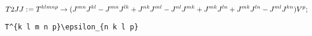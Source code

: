 \documentclass[11pt]{article}
\def\specialcolon{\mathrel{\mathop{:}}\hspace{-.5em}}
\begin{document}
\begin{dmath*}[compact, spread=2pt]
T2JJ\specialcolon{}= {T}^{k l m n p} \rightarrow ({J}^{m n} {J}^{k l} - {J}^{m n} {J}^{l k} + {J}^{n k} {J}^{m l} - {J}^{n l} {J}^{m k} + {J}^{m k} {J}^{l n} + {J}^{m k} {J}^{l n} - {J}^{m l} {J}^{k n}) {V}^{p};
\end{dmath*}
{\color[named]{Blue}\begin{verbatim}
T^{k l m n p}\epsilon_{n k l p}
\end{verbatim}}
\end{document}
